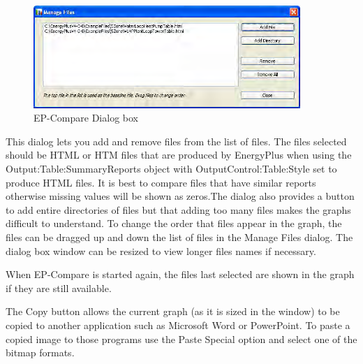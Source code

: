 \begin{figure}[hbtp] %
\centering
\includegraphics[width=0.9\textwidth, height=0.9\textheight, keepaspectratio=true]{media/image123.png}
\caption{EP-Compare Dialog box \protect \label{fig:ep-compare-dialog-box}}
\end{figure}

This dialog lets you add and remove files from the list of files. The files selected should be HTML or HTM files that are produced by EnergyPlus when using the Output:Table:SummaryReports object with OutputControl:Table:Style set to produce HTML files. It is best to compare files that have similar reports otherwise missing values will be shown as zeros.The dialog also provides a button to add entire directories of files but that adding too many files makes the graphs difficult to understand. To change the order that files appear in the graph, the files can be dragged up and down the list of files in the Manage Files dialog. The dialog box window can be resized to view longer files names if necessary.

When EP-Compare is started again, the files last selected are shown in the graph if they are still available.

The Copy button allows the current graph (as it is sized in the window) to be copied to another application such as Microsoft Word or PowerPoint. To paste a copied image to those programs use the Paste Special option and select one of the bitmap formats.
